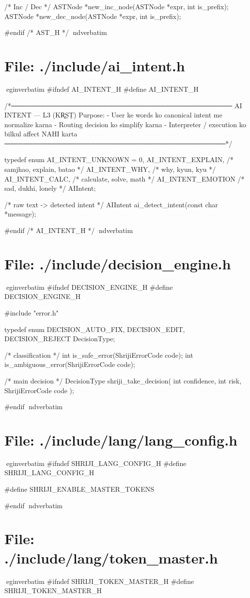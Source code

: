 \documentclass{article}
\begin{document}
/* Inc / Dec */
ASTNode *new_inc_node(ASTNode *expr, int is_prefix);
ASTNode *new_dec_node(ASTNode *expr, int is_prefix);

#endif /* AST_H */
nd{verbatim}
\section*{File: ./include/ai_intent.h}
egin{verbatim}
#ifndef AI_INTENT_H
#define AI_INTENT_H

/*──────────────────────────────────────────────
  AI INTENT — L3 (KR̥ṢṬ)
  Purpose:
  - User ke words ko canonical intent me normalize karna
  - Routing decision ko simplify karna
  - Interpreter / execution ko bilkul affect NAHI karta
──────────────────────────────────────────────*/

typedef enum {
    AI_INTENT_UNKNOWN = 0,
    AI_INTENT_EXPLAIN,   /* samjhao, explain, batao */
    AI_INTENT_WHY,       /* why, kyun, kyu */
    AI_INTENT_CALC,      /* calculate, solve, math */
    AI_INTENT_EMOTION    /* sad, dukhi, lonely */
} AIIntent;

/* raw text -> detected intent */
AIIntent ai_detect_intent(const char *message);

#endif /* AI_INTENT_H */
nd{verbatim}
\section*{File: ./include/decision_engine.h}
egin{verbatim}
#ifndef DECISION_ENGINE_H
#define DECISION_ENGINE_H

#include "error.h"

typedef enum {
    DECISION_AUTO_FIX,
    DECISION_EDIT,
    DECISION_REJECT
} DecisionType;

/* classification */
int is_safe_error(ShrijiErrorCode code);
int is_ambiguous_error(ShrijiErrorCode code);

/* main decision */
DecisionType shriji_take_decision(
    int confidence,
    int risk,
    ShrijiErrorCode code
);

#endif
nd{verbatim}
\section*{File: ./include/lang/lang_config.h}
egin{verbatim}
#ifndef SHRIJI_LANG_CONFIG_H
#define SHRIJI_LANG_CONFIG_H

#define SHRIJI_ENABLE_MASTER_TOKENS

#endif
nd{verbatim}
\section*{File: ./include/lang/token_master.h}
egin{verbatim}
#ifndef SHRIJI_TOKEN_MASTER_H
#define SHRIJI_TOKEN_MASTER_H
\end{document}
